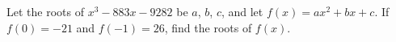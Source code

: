 Let the roots of $x^3-883x-9282$ be $a$, $b$, $c$, and let $f(x)=ax^2+bx+c$. If $f(0)=-21$ and $f(-1)=26$, find the roots of $f(x)$.
